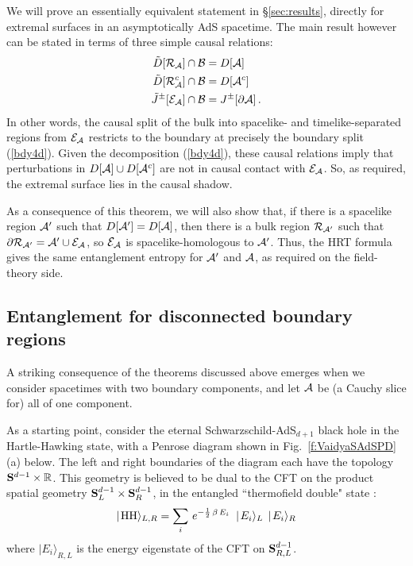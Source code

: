 \documentclass[12pt]{article}
\def\bulkD{{\tilde D}}
\def\bulkJ{{\tilde J}}
\def\bdy{{\cal B}}
\def\regA{{\cal A}}
\def\regAc{{\cal A}^c}
\def\entsurf{
\partial \regA}
\def\domdA{D[\regA]}
\def\domdAc{D[\regAc]}
\def\extr{{\cal E}_\regA}
\def\homsurfA{{\cal R}_{\regA}}
\def\homsurfAc{{\cal R}_{\regA}^c}
\def\SAdS#1{Schwarzschild-AdS$_{#1}$}
\def\ket#1{\mid \! #1\rangle}
\def\RR{{\mathbb R}}
\begin{document}
We will prove an essentially equivalent statement in \S\ref{sec:results}, directly for extremal surfaces in an asymptotically AdS spacetime. The main result however can be stated in terms of three simple causal relations:
%
\begin{equation}
\begin{split}
	\bulkD[\homsurfA] \cap \bdy & =  \domdA \\
	\bulkD[\homsurfAc] \cap \bdy & =  \domdAc \\
	\bulkJ^{\pm}[\extr] \cap \bdy & =  J^{\pm}[\entsurf]\,.
\end{split}	
\label{finalrels}
\end{equation}
%
In other words, the causal split of the bulk into spacelike- and timelike-separated regions from $\extr$ restricts to the boundary at precisely the boundary split  (\ref{bdy4d}).
Given the decomposition (\ref{bdy4d}), these causal relations imply that perturbations in $D[\regA]\cup D[\regAc]$ are not in causal contact with $\extr$. So, as required, the extremal surface lies in the causal shadow.

As a consequence of this theorem, we will also show that, if there is a spacelike region $\regA' $ such that $D[\regA'] = D[\regA]$, then there is a bulk region ${\cal R}_{\regA'}$ such that $\partial{\cal R}_{\regA'}= \regA'\cup\extr$, so $\extr$ is spacelike-homologous to $\regA'$. Thus, the HRT formula gives the same entanglement entropy for $\regA'$ and $\regA$, as required on the field-theory side.


\subsection{Entanglement for disconnected boundary regions}
\label{sec:gexpt}

A striking consequence of the theorems discussed above emerges when we consider spacetimes with two boundary components, and let $\regA$ be (a Cauchy slice for) all of one component.

As a starting point,  consider the eternal \SAdS{d+1} black hole in the Hartle-Hawking state, with a Penrose diagram shown in  Fig.~\ref{f:VaidyaSAdSPD}(a) below.  The left and right boundaries of the diagram each have the topology ${\bf S}^{d-1}\times \RR$. This  geometry is believed to be dual to the CFT on the product spatial geometry ${\bf S}^{d-1}_L\times {\bf S}^{d-1}_R$, in the entangled ``thermofield double" state \cite{Horowitz:1998xk,Balasubramanian:1998de,CarneirodaCunha:2001jf,Maldacena:2001kr}:
%
\begin{equation}
\ket{{\rm HH }}_{L,R} = \sum_i\, e^{-\frac{1}{2}\,\beta \, E_i} \; \ket{E_i}_L \, \ket{E_i}_R
\label{hhstate}
\end{equation}	
%
where $\ket{E_i}_{R,L}$ is the energy eigenstate of the CFT on ${\bf S}^{d-1}_{R,L}$.  
\end{document}
